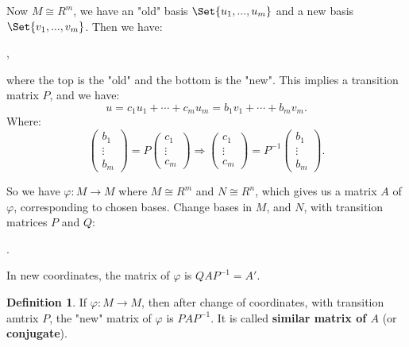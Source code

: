 \documentclass[9pt,reqno,twoside]{amsbook}
\theoremstyle{plain}
\numberwithin{section}{chapter}
\numberwithin{equation}{chapter}
\theoremstyle{definition}
\newtheorem{Def}[theorem]{Definition}
\theoremstyle{remark}
\theoremstyle{plain}
\newcommand{\lpar}{\left(}
\newcommand{\rpar}{\right)}
\renewcommand{\phi}{\varphi}
\begin{document}
Now $M \cong R^m$, we have an "old" basis $\Set{u_1,...,u_m}$ and a new basis $\Set{v_1,...,v_m}$. Then we have: 
\begin{center}
 ,
\end{center}
where the top is the "old" and the bottom is the "new". This implies a transition matrix $P$, and we have:
$$
u = c_1u_1 + \cdots + c_mu_m = b_1v_1 + \cdots + b_mv_m.
$$
Where:
$$
\lpar 
\begin{matrix}
b_1\\
\vdots\\
b_m
\end{matrix} \rpar = P\lpar 
\begin{matrix}
c_1\\
\vdots\\
c_m
\end{matrix} \rpar \Rightarrow \lpar 
\begin{matrix}
c_1\\
\vdots\\
c_m
\end{matrix} \rpar = P^{-1}\lpar 
\begin{matrix}
b_1\\
\vdots\\
b_m
\end{matrix} \rpar. 
$$

So we have $\phi:M \to M$ where $M \cong R^m$ and $N \cong R^n$, which gives us a matrix $A$ of $\phi$, corresponding to chosen bases. Change bases in $M$, and $N$, with transition matrices $P$ and $Q$:
\begin{center}
.
\end{center}
In new coordinates, the matrix of $\phi$ is $QAP^{-1} = A'$. 

\begin{Def}
If $\phi: M \to M$, then after change of coordinates, with transition amtrix $P$, the "new" matrix of $\phi$ is $PAP^{-1}$. It is called \textbf{similar matrix of $A$} (or \textbf{conjugate}). 
\end{Def}
\end{document}

